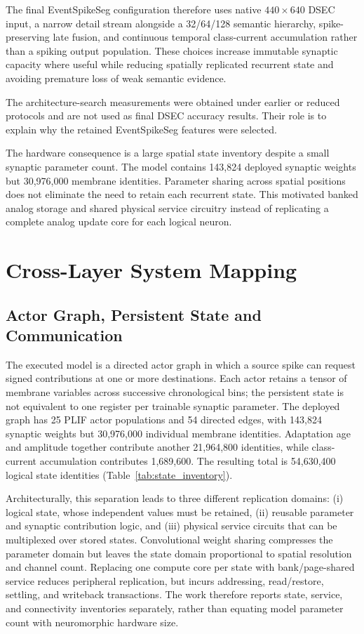 \documentclass[preprint,12pt,number]{elsarticle}
\newcommand{\SynWeights}{143,824}
\newcommand{\NumPLIF}{30,976,000}
\begin{document}
The final EventSpikeSeg configuration therefore uses native $440\times640$ DSEC input, a narrow detail stream alongside a 32/64/128 semantic hierarchy, spike-preserving late fusion, and continuous temporal class-current accumulation rather than a spiking output population. These choices increase immutable synaptic capacity where useful while reducing spatially replicated recurrent state and avoiding premature loss of weak semantic evidence.

The architecture-search measurements were obtained under earlier or reduced protocols and are not used as final DSEC accuracy results. Their role is to explain why the retained EventSpikeSeg features were selected.

The hardware consequence is a large spatial state inventory despite a small synaptic parameter count. The model contains \SynWeights{} deployed synaptic weights but \NumPLIF{} membrane identities. Parameter sharing across spatial positions does not eliminate the need to retain each recurrent state. This motivated banked analog storage and shared physical service circuitry instead of replicating a complete analog update core for each logical neuron.

\section{Cross-Layer System Mapping}
\label{sec:mapping}
\subsection{Actor Graph, Persistent State and Communication}
The executed model is a directed actor graph in which a source spike can request signed contributions at one or more destinations. Each actor retains a tensor of membrane variables across successive chronological bins; the persistent state is not equivalent to one register per trainable synaptic parameter. The deployed graph has 25 PLIF actor populations and 54 directed edges, with 143,824 synaptic weights but 30,976,000 individual membrane identities. Adaptation age and amplitude together contribute another 21,964,800 identities, while class-current accumulation contributes 1,689,600. The resulting total is 54,630,400 logical state identities (Table~\ref{tab:state_inventory}).

Architecturally, this separation leads to three different replication domains: (i) logical state, whose independent values must be retained, (ii) reusable parameter and synaptic contribution logic, and (iii) physical service circuits that can be multiplexed over stored states. Convolutional weight sharing compresses the parameter domain but leaves the state domain proportional to spatial resolution and channel count. Replacing one compute core per state with bank/page-shared service reduces peripheral replication, but incurs addressing, read/restore, settling, and writeback transactions. The work therefore reports state, service, and connectivity inventories separately, rather than equating model parameter count with neuromorphic hardware size.
\end{document}
